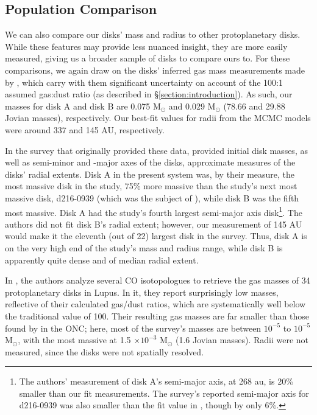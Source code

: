 \subsection{Population Comparison}

We can also compare our disks' mass and radius to other protoplanetary disks. While these features may provide less nuanced insight, they are more easily measured, giving us a broader sample of disks to compare ours to. For these comparisons, we again draw on the disks' inferred gas mass measurements made by \cite{Williams2014}, which carry with them significant uncertainty on account of the 100:1 assumed gas:dust ratio (as described in \S\ref{section:introduction}). As such, our masses for disk A and disk B are 0.075 M$_\odot$ and 0.029 M$_\odot$ (78.66 and 29.88 Jovian masses), respectively. Our best-fit values for radii from the MCMC models were around 337 and 145 AU, respectively.

In the survey that originally provided these data, \citet{Mann2014} provided initial disk masses, as well as semi-minor and -major axes of the disks, approximate measures of the disks' radial extents. Disk A in the present system was, by their measure, the most massive disk in the study, 75\% more massive than the study's next most massive disk, d216-0939 (which was the subject of \citet{Factor2017}), while disk B was the fifth most massive. Disk A had the study's fourth largest semi-major axis disk\footnote{The authors' measurement of disk A's semi-major axis, at 268 au, is 20\% smaller than our fit measurements. The survey's reported semi-major axis for d216-0939 was also smaller than the fit value in \citet{Factor2017}, though by only 6\%.}. The authors did not fit disk B's radial extent; however, our measurement of 145 AU would make it the eleventh (out of 22) largest disk in the survey. Thus, disk A is on the very high end of the study's mass and radius range, while disk B is apparently quite dense and of median radial extent.


In \citet{Miotello2017}, the authors analyze several CO isotopologues to retrieve the gas masses of 34 protoplanetary disks in Lupus. In it, they report surprisingly low masses, reflective of their calculated gas/dust ratios, which are systematically well below the traditional value of 100. Their resulting gas masses are far smaller than those found by \cite{Mann2014} in the ONC; here, most of the survey's masses are between $10^{-5}$ to $10^{-5}$ M$_\odot$, with the most massive at 1.5 $\times 10^{-3}$ M$_\odot$ (1.6 Jovian masses). Radii were not measured, since the disks were not spatially resolved.



